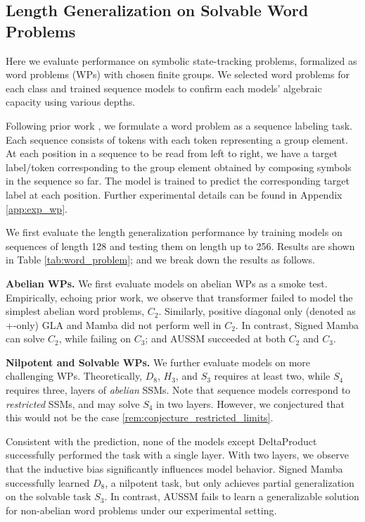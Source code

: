 \documentclass{article}
\theoremstyle{plain}
\theoremstyle{definition}
\theoremstyle{remark}
\begin{document}
\subsection{Length Generalization on Solvable Word Problems}
\label{sec:exp_wp}
Here we evaluate performance on symbolic state-tracking problems, formalized as word problems (WPs) with chosen finite groups.
We selected word problems for each class and trained sequence models to confirm each models' algebraic capacity using various depths.

Following prior work \citep{merrill2024illusion,siems2025deltaproduct}, we formulate a word problem as a sequence labeling task.
Each sequence consists of tokens with each token representing a group element.
At each position in a sequence to be read from left to right, we have a target label/token corresponding to the group element obtained by composing symbols in the sequence so far.
The model is trained to predict the corresponding target label at each position.
Further experimental details can be found in Appendix \ref{app:exp_wp}.

We first evaluate the length generalization performance by training models on sequences of length 128 and testing them on length up to 256.
Results are shown in Table \ref{tab:word_problem}; and we break down the results as follows.

\textbf{Abelian WPs.}
We first evaluate models on abelian WPs as a smoke test.
Empirically, echoing prior work, we observe that transformer failed to model the simplest abelian word problems, $C_2$.
Similarly, positive diagonal only (denoted as +-only) GLA and Mamba did not perform well in $C_2$.
In contrast, Signed Mamba can solve $C_2$, while failing on $C_3$; and AUSSM succeeded at both $C_2$ and $C_3$.

\textbf{Nilpotent and Solvable WPs.}
We further evaluate models on more challenging WPs.
Theoretically, $D_8$, $H_3$, and $S_3$ requires at least two, while $S_4$ requires three, layers of \emph{abelian} SSMs.
Note that sequence models correspond to \emph{restricted} SSMs, and may solve $S_4$ in two layers. However, we conjectured that this would not be the case \cref{rem:conjecture_restricted_limits}.

Consistent with the prediction, none of the models except DeltaProduct successfully performed the task with a single layer.
With two layers, we observe that the inductive bias significantly influences model behavior.
Signed Mamba successfully learned $D_8$, a nilpotent task,
but only achieves partial generalization on the solvable task $S_3$.
In contrast, AUSSM fails to learn a generalizable solution for
non-abelian word problems under our experimental setting.
\end{document}
